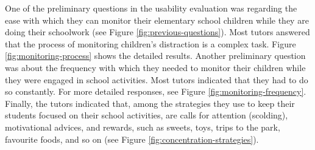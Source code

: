 \documentclass[a4paper,fleqn]{cas-sc}
\begin{document}
				One of the preliminary questions in the usability evaluation was regarding the ease with which they can monitor their elementary school children  while they are doing their schoolwork (see Figure \ref{fig:previous-questions}). Most tutors answered that the process of monitoring children's distraction is a complex task. Figure \ref{fig:monitoring-process} shows the detailed results. Another preliminary question was about the frequency with which they needed to monitor their children while they were engaged in school activities. Most tutors indicated that they had to  do so constantly. For more detailed responses, see Figure \ref{fig:monitoring-frequency}. Finally, the tutors indicated that, among the strategies they use to keep their students focused on their school activities, are calls for attention (scolding), motivational advices, and rewards, such as sweets, toys, trips to the park, favourite foods, and so on (see Figure \ref{fig:concentration-strategies}).
				
\end{document}
